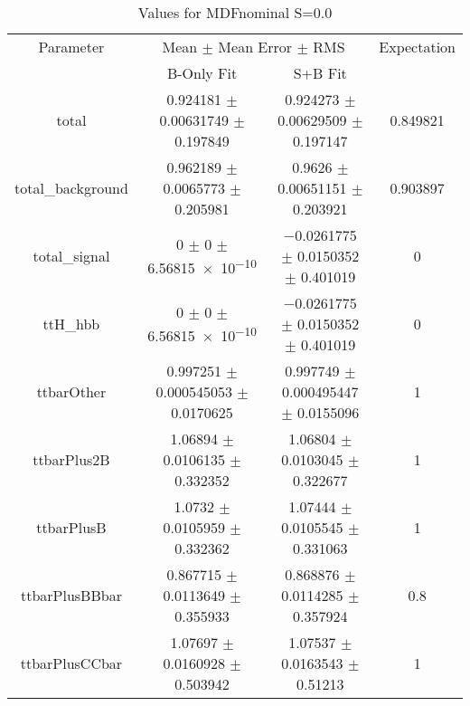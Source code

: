 \begin{table}
\centering
\caption{Values for MDFnominal S=0.0}
\begin{tabular}{cccc}
\toprule
Parameter & \multicolumn{2}{c}{Mean $\pm$ Mean Error $\pm$ RMS} & Expectation\\
 & B-Only Fit & S+B Fit & \\
\midrule
total & \num{0.924181} $\pm$ \num{0.00631749} $\pm$ \num{0.197849} & \num{0.924273} $\pm$ \num{0.00629509} $\pm$ \num{0.197147} & \num{0.849821}\\
total\_background & \num{0.962189} $\pm$ \num{0.0065773} $\pm$ \num{0.205981} & \num{0.9626} $\pm$ \num{0.00651151} $\pm$ \num{0.203921} & \num{0.903897}\\
total\_signal & \num{0} $\pm$ \num{0} $\pm$ \num{6.56815e-10} & \num{-0.0261775} $\pm$ \num{0.0150352} $\pm$ \num{0.401019} & \num{0}\\
ttH\_hbb & \num{0} $\pm$ \num{0} $\pm$ \num{6.56815e-10} & \num{-0.0261775} $\pm$ \num{0.0150352} $\pm$ \num{0.401019} & \num{0}\\
ttbarOther & \num{0.997251} $\pm$ \num{0.000545053} $\pm$ \num{0.0170625} & \num{0.997749} $\pm$ \num{0.000495447} $\pm$ \num{0.0155096} & \num{1}\\
ttbarPlus2B & \num{1.06894} $\pm$ \num{0.0106135} $\pm$ \num{0.332352} & \num{1.06804} $\pm$ \num{0.0103045} $\pm$ \num{0.322677} & \num{1}\\
ttbarPlusB & \num{1.0732} $\pm$ \num{0.0105959} $\pm$ \num{0.332362} & \num{1.07444} $\pm$ \num{0.0105545} $\pm$ \num{0.331063} & \num{1}\\
ttbarPlusBBbar & \num{0.867715} $\pm$ \num{0.0113649} $\pm$ \num{0.355933} & \num{0.868876} $\pm$ \num{0.0114285} $\pm$ \num{0.357924} & \num{0.8}\\
ttbarPlusCCbar & \num{1.07697} $\pm$ \num{0.0160928} $\pm$ \num{0.503942} & \num{1.07537} $\pm$ \num{0.0163543} $\pm$ \num{0.51213} & \num{1}\\
\bottomrule
\end{tabular}
\end{table}
